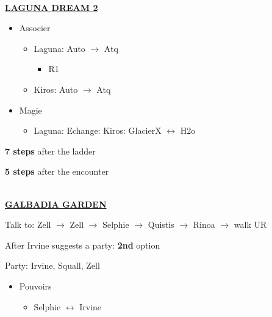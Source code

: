 \leavevmode\\
\underline{\textbf{LAGUNA DREAM 2}}
\begin{menu}
	\begin{itemize}
		\item Associer
			\begin{itemize}
				\item Laguna: Auto $\rightarrow$ Atq
					\begin{itemize}
						\item R1
					\end{itemize}
				\item Kiros: Auto $\rightarrow$ Atq
			\end{itemize}
		\item Magie
			\begin{itemize}
				\item Laguna: Echange: Kiros: GlacierX $\leftrightarrow$ H2o
			\end{itemize}
	\end{itemize}
\end{menu}

\textbf{7 steps} after the ladder

\textbf{5 steps} after the encounter

\leavevmode\\
\underline{\textbf{GALBADIA GARDEN}}

Talk to: Zell $\rightarrow$ Zell $\rightarrow$ Selphie $\rightarrow$ Quistis $\rightarrow$ Rinoa $\rightarrow$ walk UR

After Irvine suggests a party: \textbf{2nd} option

Party: Irvine, Squall, Zell
\begin{itemize}
	\item Pouvoirs
		\begin{itemize}
			\item Selphie $\leftrightarrow$ Irvine
		\end{itemize}
\end{itemize}

